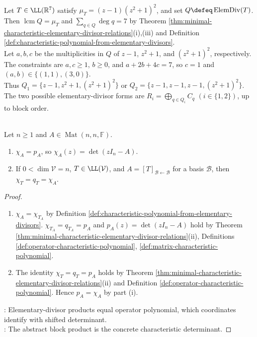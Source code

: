 \begin{example} \label{ex:rational-canonical-forms-from-minimal-polynomial} \\
Let $T\in\LL(\mathbb{R}^7)$ satisfy $\mu_T=(z-1)(z^2+1)^2$, and set $Q\defeq\operatorname{ElemDiv}(T)$.\\
Then $\operatorname{lcm}Q=\mu_T$ and $\sum\limits_{q\in Q}\deg q=7$ by Theorem \ref{thm:minimal-characteristic-elementary-divisor-relations}(i),(iii) and Definition \ref{def:characteristic-polynomial-from-elementary-divisors}.\\
Let $a,b,c$ be the multiplicities in $Q$ of $z-1$, $z^2+1$, and $(z^2+1)^2$, respectively.\\
The constraints are $a,c\geq1$, $b\geq0$, and $a+2b+4c=7$, so $c=1$ and $(a,b)\in\{(1,1),(3,0)\}$.\\
Thus $Q_1=\{z-1,z^2+1,(z^2+1)^2\}$ or $Q_2=\{z-1,z-1,z-1,(z^2+1)^2\}$.\\
The two possible elementary-divisor forms are $R_i=\bigoplus\limits_{q\in Q_i}C_q$ $(i\in\{1,2\})$, up to block order.
\end{example}

\begin{theorem} \label{thm:determinant-form-characteristic-polynomial} \\
Let $n\geq1$ and $A\in\operatorname{Mat}(n,n,\mathbb{F})$.
\begin{enumerate}[label=(\roman*)]
\setlength{\itemsep}{0pt}
\item $\chi_A=p_A$, so $\chi_A(z)=\det(zI_n-A)$.
\item If $0<\dim\mathcal{V}=n$, $T\in\LL(\mathcal{V})$, and $A=[T]_{\mathcal{B}\leftarrow\mathcal{B}}$ for a basis $\mathcal{B}$, then $\chi_T=q_T=\chi_A$.
\end{enumerate}
\begin{proof}
\begin{enumerate}[label=(\roman*)]
\setlength{\itemsep}{0pt}
\item $\chi_A=\chi_{T_A}$ by Definition \ref{def:characteristic-polynomial-from-elementary-divisors}. $\chi_{T_A}=q_{T_A}=p_A$ and $p_A(z)=\det(zI_n-A)$ hold by Theorem \ref{thm:minimal-characteristic-elementary-divisor-relations}(ii), Definitions \ref{def:operator-characteristic-polynomial}, \ref{def:matrix-characteristic-polynomial}.
\item The identity $\chi_T=q_T=p_A$ holds by Theorem \ref{thm:minimal-characteristic-elementary-divisor-relations}(ii) and Definition \ref{def:operator-characteristic-polynomial}. Hence $p_A=\chi_A$ by part (i).
\end{enumerate}
: Elementary-divisor products equal operator polynomial, which coordinates identify with shifted determinant.\\
: The abstract block product is the concrete characteristic determinant.
\end{proof}
\end{theorem}

